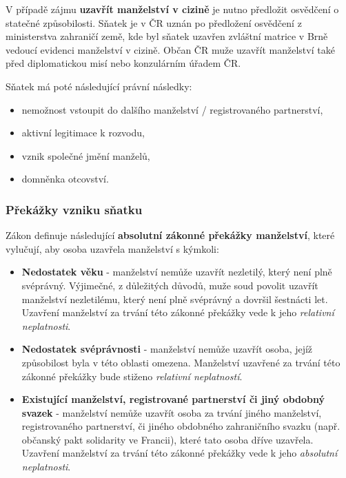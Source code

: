 V případě zájmu \textbf{uzavřít manželství v cizině} je nutno předložit osvědčení o statečné způsobilosti. Sňatek je v ČR uznán po předložení osvědčení z ministerstva zahraničí země, kde byl sňatek uzavřen zvláštní matrice v Brně vedoucí evidenci manželství v cizině. Občan ČR muže uzavřít manželství také před diplomatickou misí nebo konzulárním úřadem ČR.

Sňatek má poté následující právní následky:

\begin{itemize}
    \item nemožnost vstoupit do dalšího manželství / registrovaného partnerství,
    \item aktivní legitimace k rozvodu,
    \item vznik společné jmění manželů,
    \item domněnka otcovství.
\end{itemize}
 
\subsubsection{Překážky vzniku sňatku}

Zákon definuje následující \textbf{absolutní zákonné překážky manželství}, které vylučují, aby osoba uzavřela manželství s kýmkoli:

\begin{itemize}
    \item \textbf{Nedostatek věku} - manželství nemůže uzavřít nezletilý, který není plně svéprávný. Výjimečné, z důležitých důvodů, muže soud povolit uzavřít manželství nezletilému, který není plně svéprávný a dovršil šestnácti let. Uzavření manželství za trvání této zákonné překážky vede k jeho \textit{relativní neplatnosti}.
    \item \textbf{Nedostatek svéprávnosti} - manželství nemůže uzavřít osoba, jejíž způsobilost byla v této oblasti omezena. Manželství uzavřené za trvání této zákonné překážky bude stiženo \textit{relativní neplatností}.
    \item \textbf{Existující manželství, registrované partnerství či jiný obdobný svazek} - manželství nemůže uzavřít osoba za trvání jiného manželství, registrovaného partnerství, či jiného obdobného zahraničního svazku (např. občanský pakt solidarity ve Francii), které tato osoba dříve uzavřela. Uzavření manželství za trvání této zákonné překážky vede k jeho \textit{absolutní neplatnosti}.
\end{itemize}

